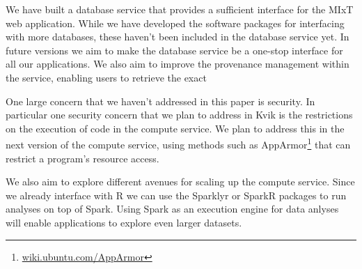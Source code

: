 We have built a database service that provides a sufficient interface for the
MIxT web application. While we have developed the software packages for
interfacing with more databases, these haven't been included in the database
service yet. In future versions we aim to make the database service be a
one-stop interface for all our applications. We also aim to improve the
provenance management within the service, enabling users to retrieve the exact 

One large concern that we haven't addressed in this paper is security. In
particular one security concern that we plan to address in Kvik is the
restrictions on the execution of code in the compute service. We plan to address
this in the next version of the compute service, using methods such as
AppArmor\footnote{\url{wiki.ubuntu.com/AppArmor}} that can restrict a program's
resource access. 

We also aim to explore different avenues for scaling up the compute service.
Since we already interface with R we can use the Sparklyr or SparkR packages
to run analyses on top of Spark. Using Spark as an execution engine for data
anlyses will enable applications to explore even larger datasets. 
